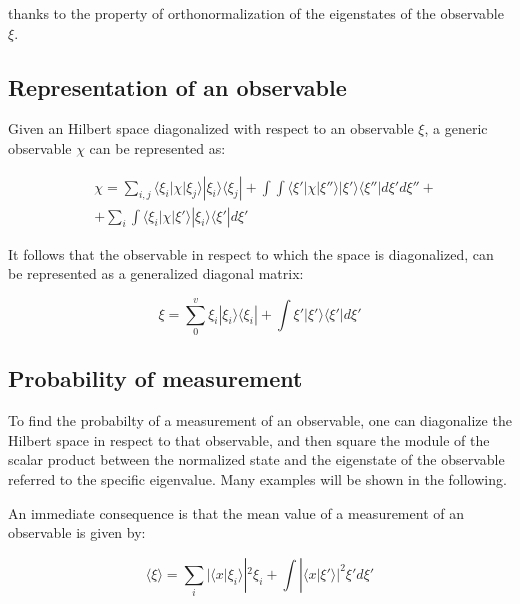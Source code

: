 \documentclass{report}
\begin{document}
thanks to the property of orthonormalization of the eigenstates of the observable $\xi$.

\subsection{Representation of an observable}

\begin{tcolorbox}[colframe=gray!50, colback=gray!10, coltitle=black, title=Observable Representation]
  Given an Hilbert space diagonalized with respect to an observable $\xi$, a generic observable $\chi$ can be represented as:

  \begin{equation}
    \begin{aligned}
       & \chi= \sum_{i,j} \langle \xi_i|\chi|\xi_j\rangle |\xi_i\rangle \langle \xi_j|+ \int\int \langle \xi'|\chi|\xi''\rangle |\xi'\rangle \langle \xi''| d\xi'd\xi'' + \\
       & + \sum_i\int \langle \xi_i|\chi|\xi'\rangle |\xi_i\rangle \langle \xi'|d\xi'
    \end{aligned}
  \end{equation}

\end{tcolorbox}

It follows that the observable in respect to which the space is diagonalized, can be represented as a generalized diagonal matrix:

\begin{equation}
  \xi = \sum_{0}^{v} \xi_i|\xi_i\rangle \langle \xi_i|+ \int \xi'|\xi'\rangle \langle \xi'|d\xi'
\end{equation}

\subsection{Probability of measurement}

To find the probabilty of a measurement of an observable, one can diagonalize the Hilbert space in respect to that observable,
and then square the module of the scalar product between the normalized state and the eigenstate of the observable referred to the specific eigenvalue.
Many examples will be shown in the following.

An immediate consequence is that the mean value of a measurement of an observable is given by:

\begin{tcolorbox}[colframe=gray!50, colback=gray!10, coltitle=black, title=Mean Value of an Observable]
  \begin{equation}
    \langle \xi\rangle  = \sum_i |\langle x|\xi_i\rangle |^2 \xi_i + \int |\langle x|\xi'\rangle |^2 \xi' d\xi'
  \end{equation}
\end{tcolorbox}
\end{document}
